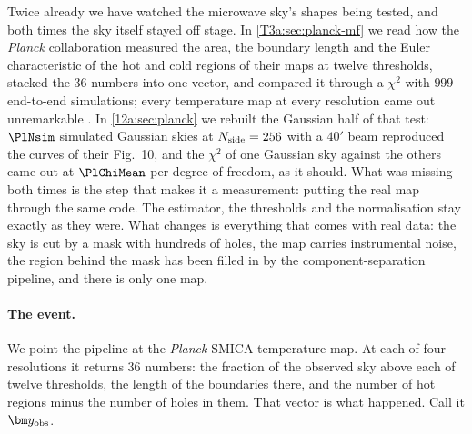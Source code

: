 Twice already we have watched the microwave sky's shapes being tested, and both times the sky itself stayed
off stage. In \cref{T3a:sec:planck-mf} we read how the \textit{Planck} collaboration measured the area, the
boundary length and the Euler characteristic of the hot and cold regions of their maps at twelve thresholds,
stacked the $36$ numbers into one vector, and compared it through a $\chi^2$ with $999$ end-to-end simulations;
every temperature map at every resolution came out unremarkable \cite{Planck2018VII}. In \cref{12a:sec:planck}
we rebuilt the Gaussian half of that test: $\PlNsim$ simulated Gaussian skies at $N_{\rm side}=256$ with a $40'$
beam reproduced the curves of their Fig.~10, and the $\chi^2$ of one Gaussian sky against the others came out at
$\PlChiMean$ per degree of freedom, as it should. What was missing both times is the step that makes it a
measurement: putting the real map through the same code. The estimator, the thresholds and the normalisation
stay exactly as they were. What changes is everything that comes with real data: the sky is cut by a mask with
hundreds of holes, the map carries instrumental noise, the region behind the mask has been filled in by the
component-separation pipeline, and there is only one map.

\paragraph{The event.} We point the pipeline at the \textit{Planck} SMICA temperature map. At each of four
resolutions it returns $36$ numbers: the fraction of the observed sky above each of twelve thresholds, the
length of the boundaries there, and the number of hot regions minus the number of holes in them. That
vector is what happened. Call it $\bm y_{\rm obs}$.

